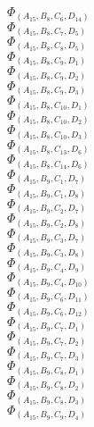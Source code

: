\documentclass[14pt]{article}
\begin{document}
    $\Phi_{({A}_{15}, {B}_{8}, {C}_{6}, {D}_{14})}$ \\ 
    $\Phi_{({A}_{15}, {B}_{8}, {C}_{7}, {D}_{5})}$ \\ 
    $\Phi_{({A}_{15}, {B}_{8}, {C}_{8}, {D}_{5})}$ \\ 
    $\Phi_{({A}_{15}, {B}_{8}, {C}_{9}, {D}_{1})}$ \\ 
    $\Phi_{({A}_{15}, {B}_{8}, {C}_{9}, {D}_{2})}$ \\ 
    $\Phi_{({A}_{15}, {B}_{8}, {C}_{9}, {D}_{3})}$ \\ 
    $\Phi_{({A}_{15}, {B}_{8}, {C}_{10}, {D}_{1})}$ \\ 
    $\Phi_{({A}_{15}, {B}_{8}, {C}_{10}, {D}_{2})}$ \\ 
    $\Phi_{({A}_{15}, {B}_{8}, {C}_{10}, {D}_{3})}$ \\ 
    $\Phi_{({A}_{15}, {B}_{8}, {C}_{13}, {D}_{6})}$ \\ 
    $\Phi_{({A}_{15}, {B}_{8}, {C}_{14}, {D}_{6})}$ \\ 
    $\Phi_{({A}_{15}, {B}_{9}, {C}_{1}, {D}_{7})}$ \\ 
    $\Phi_{({A}_{15}, {B}_{9}, {C}_{1}, {D}_{8})}$ \\ 
    $\Phi_{({A}_{15}, {B}_{9}, {C}_{2}, {D}_{7})}$ \\ 
    $\Phi_{({A}_{15}, {B}_{9}, {C}_{2}, {D}_{8})}$ \\ 
    $\Phi_{({A}_{15}, {B}_{9}, {C}_{3}, {D}_{7})}$ \\ 
    $\Phi_{({A}_{15}, {B}_{9}, {C}_{3}, {D}_{8})}$ \\ 
    $\Phi_{({A}_{15}, {B}_{9}, {C}_{4}, {D}_{9})}$ \\ 
    $\Phi_{({A}_{15}, {B}_{9}, {C}_{4}, {D}_{10})}$ \\ 
    $\Phi_{({A}_{15}, {B}_{9}, {C}_{6}, {D}_{11})}$ \\ 
    $\Phi_{({A}_{15}, {B}_{9}, {C}_{6}, {D}_{12})}$ \\ 
    $\Phi_{({A}_{15}, {B}_{9}, {C}_{7}, {D}_{1})}$ \\ 
    $\Phi_{({A}_{15}, {B}_{9}, {C}_{7}, {D}_{2})}$ \\ 
    $\Phi_{({A}_{15}, {B}_{9}, {C}_{7}, {D}_{3})}$ \\ 
    $\Phi_{({A}_{15}, {B}_{9}, {C}_{8}, {D}_{1})}$ \\ 
    $\Phi_{({A}_{15}, {B}_{9}, {C}_{8}, {D}_{2})}$ \\ 
    $\Phi_{({A}_{15}, {B}_{9}, {C}_{8}, {D}_{3})}$ \\ 
    $\Phi_{({A}_{15}, {B}_{9}, {C}_{9}, {D}_{4})}$ \\ 
\end{document}
